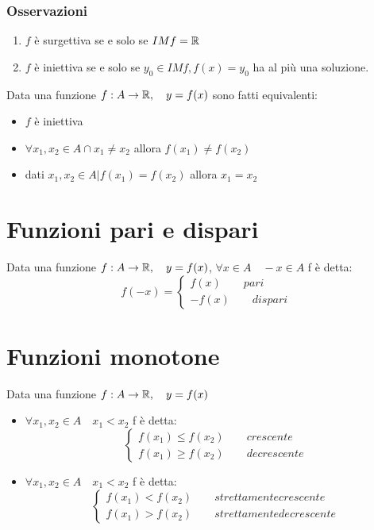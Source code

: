 \subsubsection{Osservazioni}
\begin{enumerate}
	\item $f$ è surgettiva se e solo se $IM f=\mathbb{R}$
	\item $f$ è iniettiva se e solo se $y_0 \in IM f, f(x)=y_0$ ha al più una soluzione.
\end{enumerate}

Data una funzione $f: A \rightarrow \mathbb{R} , \quad y=f(x)$ sono fatti equivalenti:
\begin{itemize}
	\item $f$ è iniettiva
	\item $\forall x_1, x_2 \in A \cap x_1 \neq x_2$ allora $f(x_1)\neq f(x_2)$
	\item dati $x_1,x_2 \in A | f(x_1)=f(x_2)$ allora $x_1=x_2$
\end{itemize}


\section{Funzioni pari e dispari}
Data una funzione $f: A \rightarrow \mathbb{R} , \quad y=f(x)$, $\forall x\in A \quad -x\in A$ f è detta:
\[f(-x)= \begin{cases}
	f(x) \qquad pari\\
	-f(x) \qquad dispari
\end{cases}
\]

\section{Funzioni monotone}
Data una funzione $f: A \rightarrow \mathbb{R} , \quad y=f(x)$
\begin{itemize}
	\item $\forall x_1, x_2 \in A \quad x_1<x_2$ f è detta:
	\[\begin{cases}
		f(x_1) \leq f(x_2) \qquad crescente\\
		f(x_1) \geq f(x_2) \qquad decrescente
	\end{cases}
	\]
	\item $\forall x_1, x_2 \in A \quad x_1<x_2$ f è detta:
	\[\begin{cases}
		f(x_1) < f(x_2) \qquad strettamente crescente\\
		f(x_1) > f(x_2) \qquad strettamente decrescente
	\end{cases}
	\]
\end{itemize}



